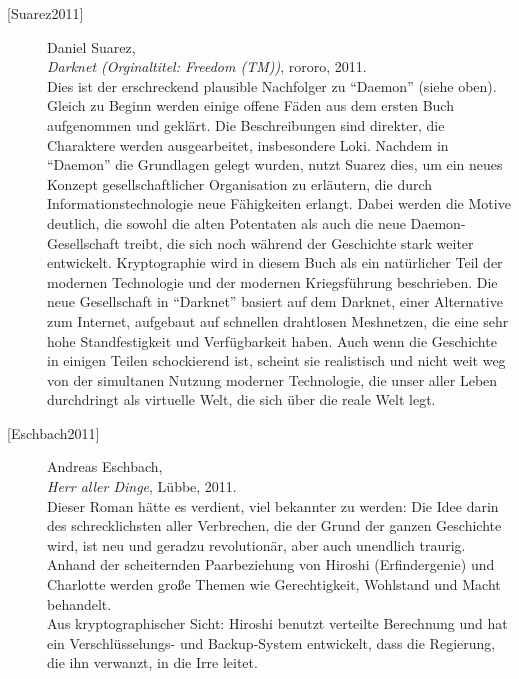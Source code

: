 \begin{description}
\item[\textrm{[Suarez2011]}] 
    Daniel Suarez, \\
    {\em Darknet (Orginaltitel: Freedom (TM))}, rororo, 2011. \\
    Dies ist der erschreckend plausible Nachfolger zu "`Daemon"' (siehe oben).
    Gleich zu Beginn werden einige offene Fäden aus dem ersten Buch aufgenommen und
    geklärt. Die Beschreibungen sind direkter, die Charaktere werden ausgearbeitet,
    insbesondere Loki. Nachdem in "`Daemon"' die Grundlagen gelegt wurden, nutzt Suarez
    dies, um ein neues Konzept gesellschaftlicher Organisation zu erläutern, die
    durch Informationstechnologie neue Fähigkeiten erlangt. Dabei werden die Motive
    deutlich, die sowohl die alten Potentaten als auch die neue Daemon-Gesellschaft
    treibt, die sich noch während der Geschichte stark weiter entwickelt.
    Kryptographie wird in diesem Buch als ein natürlicher Teil der modernen Technologie
    und der modernen Kriegsführung beschrieben.
    Die neue Gesellschaft in "`Darknet"' basiert auf dem Darknet,
    einer Alternative zum Internet, aufgebaut auf schnellen drahtlosen Meshnetzen, die
    eine sehr hohe Standfestigkeit und Verfügbarkeit haben. Auch wenn die Geschichte
    in einigen Teilen schockierend ist, scheint sie realistisch und nicht weit weg
    von der simultanen Nutzung moderner Technologie, die unser aller Leben durchdringt
    als virtuelle Welt, die sich über die reale Welt legt.\\



\item[\textrm{[Eschbach2011]}] 
    Andreas Eschbach, \\
    {\em Herr aller Dinge}, Lübbe, 2011. \\
    Dieser Roman hätte es verdient, viel bekannter zu werden: Die Idee darin des
    \glqq schrecklichsten aller Verbrechen\grqq, die der Grund der ganzen Geschichte
    wird, ist neu und geradzu revolutionär, aber auch unendlich traurig.
    Anhand der scheiternden Paarbeziehung von Hiroshi (Erfindergenie) und Charlotte
    werden große Themen wie Gerechtigkeit, Wohlstand und Macht behandelt.\\
    Aus kryptographischer Sicht: Hiroshi benutzt verteilte Berechnung und hat
    ein Verschlüs\-se\-lungs- und Backup-System entwickelt, dass die Regierung,
    die ihn verwanzt, in die Irre leitet.\\




\end{description}
